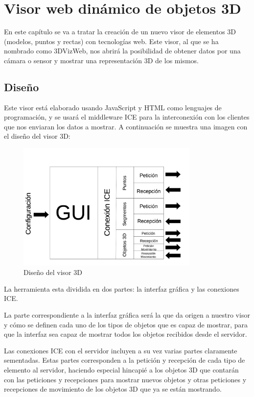 \chapter{Visor web dinámico de objetos 3D}\label{cap.visor3d}
En este capítulo se va a tratar la creación de un nuevo visor de elementos 3D (modelos, puntos y rectas) con tecnologías web. Este visor, al que se ha nombrado como 3DVizWeb, nos abrirá la posibilidad de obtener datos por una cámara o sensor y mostrar una representación 3D de los mismos.
\section{Diseño}
Este visor está elaborado usando JavaScript y HTML como lenguajes de programación, y se usará el middleware ICE para la interconexión con los clientes que nos enviaran los datos a mostrar. A continuación se muestra una imagen con el diseño del visor 3D:

\begin{figure}[H]
  \begin{center}
    \includegraphics[width=0.8\textwidth]{figures/diseno3dviz.png}
		\caption{Diseño del visor 3D}
		\label{fig.diseno3dviz}
		\end{center}
\end{figure}
La herramienta esta dividida en dos partes: la interfaz gráfica y las conexiones ICE.

La parte correspondiente a la interfaz gráfica será la que da origen a nuestro visor y cómo se definen cada uno de los tipos de objetos que es capaz de mostrar, para que la interfaz sea capaz de mostrar todos los objetos recibidos desde el servidor.

Las conexiones ICE con el servidor incluyen a su vez varias partes claramente sementadas. Estas partes corresponden a la petición y recepción de cada tipo de elemento al servidor, haciendo especial hincapié a los objetos 3D que contarán con las peticiones y recepciones para mostrar nuevos objetos y otras peticiones y recepciones de movimiento de los objetos 3D que ya se están mostrando.

